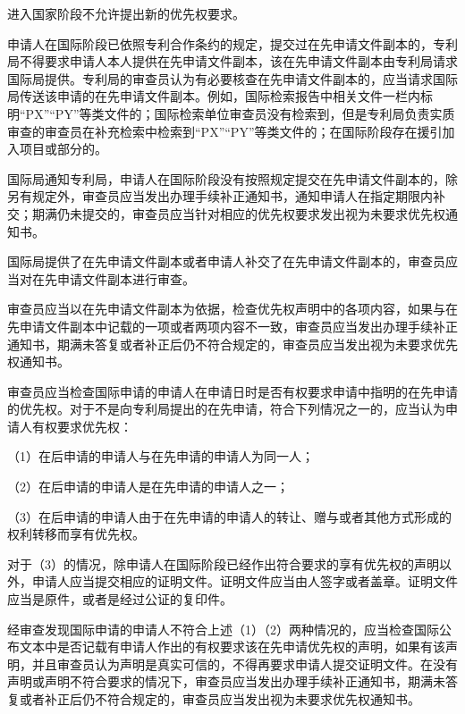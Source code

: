 进入国家阶段不允许提出新的优先权要求。

申请人在国际阶段已依照专利合作条约的规定，提交过在先申请文件副本的，专利局不得要求申请人本人提供在先申请文件副本，该在先申请文件副本由专利局请求国际局提供。专利局的审查员认为有必要核查在先申请文件副本的，应当请求国际局传送该申请的在先申请文件副本。例如，国际检索报告中相关文件一栏内标明“PX”“PY”等类文件的；国际检索单位审查员没有检索到，但是专利局负责实质审查的审查员在补充检索中检索到“PX”“PY”等类文件的；在国际阶段存在援引加入项目或部分的。

国际局通知专利局，申请人在国际阶段没有按照规定提交在先申请文件副本的，除另有规定外，审查员应当发出办理手续补正通知书，通知申请人在指定期限内补交；期满仍未提交的，审查员应当针对相应的优先权要求发出视为未要求优先权通知书。

国际局提供了在先申请文件副本或者申请人补交了在先申请文件副本的，审查员应当对在先申请文件副本进行审查。

审查员应当以在先申请文件副本为依据，检查优先权声明中的各项内容，如果与在先申请文件副本中记载的一项或者两项内容不一致，审查员应当发出办理手续补正通知书，期满未答复或者补正后仍不符合规定的，审查员应当发出视为未要求优先权通知书。

审查员应当检查国际申请的申请人在申请日时是否有权要求申请中指明的在先申请的优先权。对于不是向专利局提出的在先申请，符合下列情况之一的，应当认为申请人有权要求优先权：

{\setlength{\parindent}{17.8bp}（1）在后申请的申请人与在先申请的申请人为同一人；\par}

{\setlength{\parindent}{17.8bp}（2）在后申请的申请人是在先申请的申请人之一；\par}

{\setlength{\parindent}{17.8bp}（3）在后申请的申请人由于在先申请的申请人的转让、赠与或者其他方式形成的权利转移而享有优先权。\par}

对于（3）的情况，除申请人在国际阶段已经作出符合要求的享有优先权的声明以外，申请人应当提交相应的证明文件。证明文件应当由人签字或者盖章。证明文件应当是原件，或者是经过公证的复印件。

经审查发现国际申请的申请人不符合上述（1）（2）两种情况的，应当检查国际公布文本中是否记载有申请人作出的有权要求该在先申请优先权的声明，如果有该声明，并且审查员认为声明是真实可信的，不得再要求申请人提交证明文件。在没有声明或声明不符合要求的情况下，审查员应当发出办理手续补正通知书，期满未答复或者补正后仍不符合规定的，审查员应当发出视为未要求优先权通知书。

